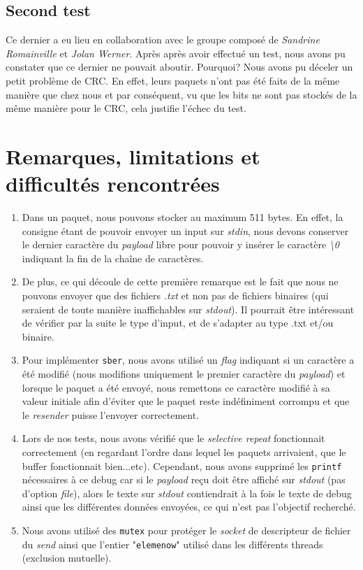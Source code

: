 \documentclass[11pt]{article}
\begin{document}
\subsection{Second test}
Ce dernier a eu lieu en collaboration avec le groupe composé de \textit{Sandrine Romainville} et \textit{Jolan Werner}. Après après avoir effectué un test, nous avons pu constater que ce dernier ne pouvait aboutir. Pourquoi? Nous avons pu déceler un petit problème de CRC. En effet, leurs paquets n'ont pas été faits de la même manière que chez nous et par conséquent, vu que les bits ne sont pas stockés de la même manière pour le CRC, cela justifie l'échec du test.

\section{Remarques, limitations et difficultés rencontrées}
\begin{enumerate}
\item Dans un paquet, nous pouvons stocker au maximum 511 bytes. En effet, la consigne étant de pouvoir envoyer un input sur \textit{stdin}, nous devons conserver le dernier caractère du \textit{payload} libre pour pouvoir y insérer le caractère \textit{\textbackslash 0} indiquant la fin de la chaîne de caractères. 
\smallskip
\item De plus, ce qui découle de cette première remarque est le fait que nous ne pouvons envoyer que des fichiers \textit{.txt} et non pas de fichiers binaires (qui seraient de toute manière inaffichables sur \textit{stdout}). Il pourrait être intéressant de vérifier par la suite le type d'input, et de s'adapter au type .txt et/ou binaire.
\smallskip
\item Pour implémenter \texttt{sber}, nous avons utilisé un \textit{flag} indiquant si un caractère a été modifié (nous modifions uniquement le premier caractère du \textit{payload}) et lorsque le paquet a été envoyé, nous remettons ce caractère modifié à sa valeur initiale afin d'éviter que le paquet reste indéfiniment corrompu et que le \textit{resender} puisse l'envoyer correctement.
\smallskip
\item Lors de nos tests, nous avons vérifié que le \textit{selective repeat} fonctionnait correctement (en regardant l'ordre dans lequel les paquets arrivaient, que le buffer fonctionnait bien...etc). Cependant, nous avons supprimé les \texttt{printf} nécessaires à ce debug car si le \textit{payload} reçu doit être affiché sur \textit{stdout} (pas d'option \textit{file}), alors le texte sur \textit{stdout} contiendrait à la fois le texte de debug ainsi que les différentes données envoyées, ce qui n'est pas l'objectif recherché. 
\smallskip
\item Nous avons utilisé des \texttt{mutex} pour protéger le \textit{socket} de descripteur de fichier du \textit{send} ainsi que l'entier "\texttt{elemenow}" utilisé dans les différents threads (exclusion mutuelle).
\end{enumerate}
\end{document}
